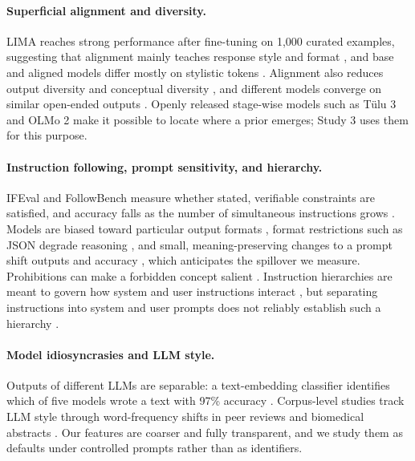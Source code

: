 \documentclass[acmsmall,screen,review,anonymous]{acmart}
\begin{document}
\paragraph{Superficial alignment and diversity.} LIMA reaches strong performance after fine-tuning on 1,000 curated examples, suggesting that alignment mainly teaches response style and format \cite{zhou2023lima}, and base and aligned models differ mostly on stylistic tokens \cite{lin2024unlocking}. Alignment also reduces output diversity \cite{kirk2024understanding} and conceptual diversity \cite{murthy2025alignment}, and different models converge on similar open-ended outputs \cite{jiang2025hivemind}. Openly released stage-wise models such as T\"ulu 3 \cite{lambert2024tulu} and OLMo 2 \cite{olmo2025furious} make it possible to locate where a prior emerges; Study 3 uses them for this purpose.

\paragraph{Instruction following, prompt sensitivity, and hierarchy.} IFEval \cite{zhou2023ifeval} and FollowBench \cite{jiang2024followbench} measure whether stated, verifiable constraints are satisfied, and accuracy falls as the number of simultaneous instructions grows \cite{harada2025instructions}. Models are biased toward particular output formats \cite{long2025format}, format restrictions such as JSON degrade reasoning \cite{tam2024speak}, and small, meaning-preserving changes to a prompt shift outputs and accuracy \cite{sclar2024quantifying,salinas2024butterfly}, which anticipates the spillover we measure. Prohibitions can make a forbidden concept salient \cite{castricato2024pink}. Instruction hierarchies are meant to govern how system and user instructions interact \cite{wallace2024instruction}, but separating instructions into system and user prompts does not reliably establish such a hierarchy \cite{geng2026control}.

\paragraph{Model idiosyncrasies and LLM style.} Outputs of different LLMs are separable: a text-embedding classifier identifies which of five models wrote a text with 97\% accuracy \cite{sun2025idiosyncrasies}. Corpus-level studies track LLM style through word-frequency shifts in peer reviews \cite{liang2024monitoring} and biomedical abstracts \cite{kobak2025delving}. Our features are coarser and fully transparent, and we study them as defaults under controlled prompts rather than as identifiers.
\end{document}
